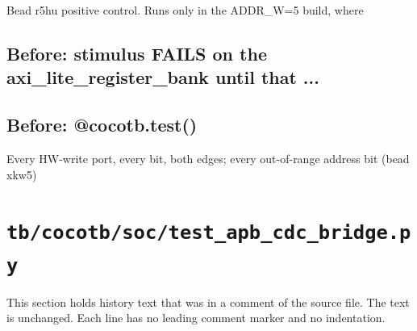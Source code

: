 \begin{record}
\begin{textblock}
Bead r5hu positive control.  Runs only in the ADDR_W=5 build, where
\end{textblock}

\subsection*{Before: stimulus FAILS on the axi\_lite\_register\_bank until that ...}


\subsection*{Before: @cocotb.test()}

\begin{textblock}
Every HW-write port, every bit, both edges; every out-of-range address bit (bead xkw5)
\end{textblock}

\end{record}

\section{\texttt{tb/cocotb/soc/test\_apb\_cdc\_bridge.py}}\label{cr:suite:soc-test-apb-cdc-bridge}

This section holds history text that was in a comment of the source file. The text is unchanged. Each line has no leading comment marker and no indentation.

